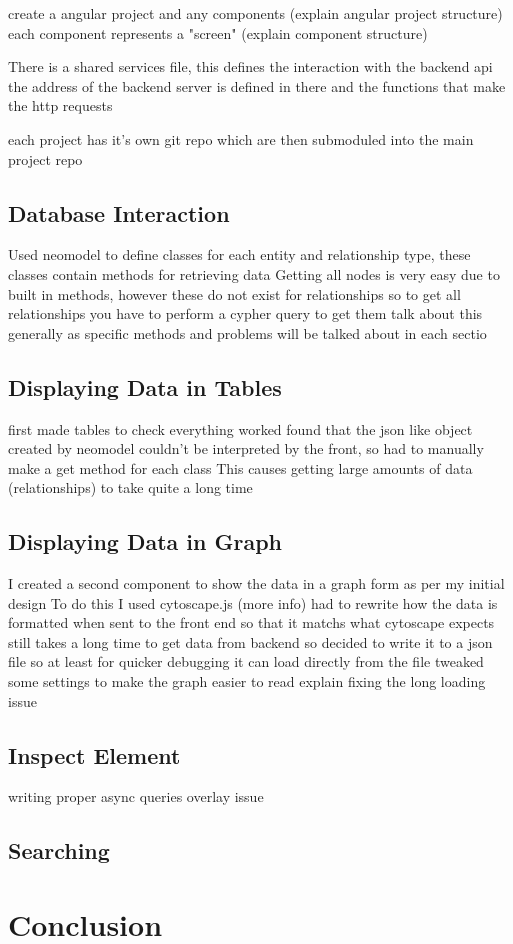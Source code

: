 create a angular project and any components
(explain angular project structure)
each component represents a "screen"
(explain component structure)

There is a shared services file, this defines the interaction with the backend api
the address of the backend server is defined in there and the functions that make the http requests

each project has it's own git repo which are then submoduled into the main project repo
\subsection{Database Interaction}
Used neomodel to define classes for each entity and relationship type, these classes contain methods for retrieving data
Getting all nodes is very easy due to built in methods, however these do not exist for relationships
so to get all relationships you have to perform a cypher query to get them
talk about this generally as specific methods and problems will be talked about in each sectio
\subsection{Displaying Data in Tables}
first made tables to check everything worked
found that the json like object created by neomodel couldn't be interpreted by the front, so had to manually make a get method for each class
This causes getting large amounts of data (relationships) to take quite a long time
\subsection{Displaying Data in Graph}
I created a second component to show the data in a graph form as per my initial design
To do this I used cytoscape.js (more info)
had to rewrite how the data is formatted when sent to the front end so that it matchs what cytoscape expects
still takes a long time to get data from backend 
so decided to write it to a json file so at least for quicker debugging it can load directly from the file
tweaked some settings to make the graph easier to read
explain fixing the long loading issue
\subsection{Inspect Element}
writing proper async queries
overlay issue
\subsection{Searching}
\section{Conclusion}